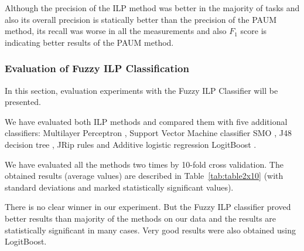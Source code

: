 \documentclass[12pt,a4paper,twoside,notitlepage]{article}
\begin{document}
Although the precision of the ILP method was better in the majority of tasks and also its overall precision is statically better than the precision of the PAUM method, its recall was worse in all the measurements and also $F_1$ score is indicating better results of the PAUM method. 

\subsubsection{Evaluation of Fuzzy ILP Classification} \label{sec:fuzzy_eval}
\graphicspath{{../img/ch80/}}

In this section, evaluation experiments with the Fuzzy ILP Classifier will be presented. 

We have evaluated both ILP methods and compared them with five additional classifiers:
Multilayer Perceptron \citep{biblio:bishop-1995},
Support Vector Machine classifier SMO \citep{biblio:SMO},
J48 decision tree \citep{biblio:J48},
JRip rules \citep{weka:JRip} and
Additive logistic regression LogitBoost \citep{biblio:LogitBoost}.


We have evaluated all the methods two times by 10-fold cross validation. %
The obtained results (average values) are described in Table~\ref{tab:table2x10} (with standard deviations and marked statistically significant values).

There is no clear winner in our experiment. But the Fuzzy ILP classifier proved better results than majority of the methods on our data and the results are statistically significant in many cases. Very good results were also obtained using LogitBoost. 
\end{document}
